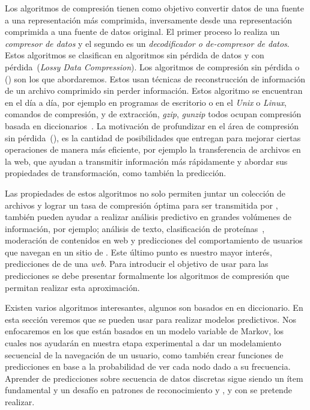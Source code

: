 Los algoritmos de compresión tienen como objetivo convertir datos de una fuente a una representación más comprimida, inversamente desde una representación comprimida a una fuente de datos original. El primer proceso lo realiza un \emph{compresor de datos} y el segundo es un \emph{decodificador o de-compresor de datos}. Estos algoritmos se clasifican en algoritmos sin pérdida de datos  y con pérdida~(\emph{Lossy Data Compression}). Los algoritmos de compresión sin pérdida o  \losslessdatacompression(\LDC) son los que abordaremos. Estos usan técnicas de reconstrucción de información de un archivo comprimido sin perder información. Estos algoritmo se encuentran en el día a día, por ejemplo en programas de escritorio o en el \emph{Unix} o \emph{Linux}, comandos de compresión, y de extracción, \emph{gzip}, \emph{gunzip} todos ocupan compresión basada en diccionarios~\cite{MengyiPu2006}. La motivación de profundizar en el área de compresión sin pérdida~(\LDC), es la cantidad de posibilidades que entregan para mejorar ciertas operaciones de manera más eficiente, por ejemplo la  transferencia de archivos en la web, que ayudan a transmitir información más rápidamente y abordar sus propiedades de transformación, como también la predicción.


Las propiedades de estos algoritmos no solo permiten juntar un colección de archivos y lograr un tasa de compresión óptima para ser transmitida por \inet, también pueden ayudar a realizar análisis predictivo en grandes volúmenes de información, por ejemplo; análisis de texto, clasificación de proteínas~\cite[sección 6]{Begleiter2004}, moderación de contenidos en web y predicciones del comportamiento de usuarios que navegan en un sitio de \inet. Este último punto es nuestro mayor interés, predicciones de \webasccesslog de una \emph{web}. Para introducir el objetivo de usar \LDC para las predicciones se debe presentar formalmente los algoritmos de compresión que permitan realizar esta aproximación.

Existen varios algoritmos \losslessdatacompression interesantes, algunos son basados en en diccionario. En esta sección veremos que se pueden usar para realizar modelos predictivos. Nos enfocaremos en los que están basados en un modelo variable de Markov, los cuales nos ayudarán en nuestra etapa experimental a dar un modelamiento secuencial de la navegación de un usuario, como también crear funciones de predicciones en base a la probabilidad de ver cada nodo dado a su frecuencia. Aprender de predicciones sobre secuencia de datos discretas sigue siendo un ítem fundamental y un desafío en patrones de reconocimiento y \machinelearning, y con \LDC se pretende realizar.





